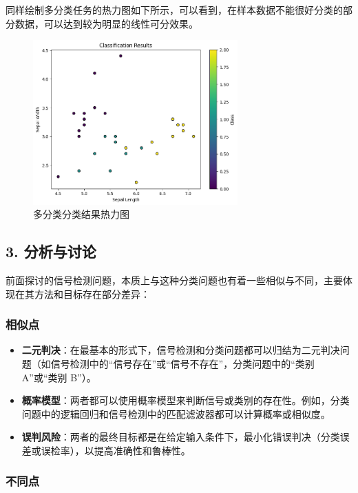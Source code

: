 \documentclass[12pt]{ctexart}
\begin{document}
同样绘制多分类任务的热力图如下所示，可以看到，在样本数据不能很好分类的部分数据，可以达到较为明显的线性可分效果。

\begin{figure}[H]
    \centering
    \includegraphics[width=0.7\textwidth]{image/output8.png}
    \caption{多分类分类结果热力图}
\end{figure}

\subsection*{3. 分析与讨论}

前面探讨的信号检测问题，本质上与这种分类问题也有着一些相似与不同，主要体现在其方法和目标存在部分差异：

\subsubsection*{相似点}

\begin{itemize}
    \item \textbf{二元判决}：在最基本的形式下，信号检测和分类问题都可以归结为二元判决问题（如信号检测中的“信号存在”或“信号不存在”，分类问题中的“类别 A”或“类别 B”）。
    \item \textbf{概率模型}：两者都可以使用概率模型来判断信号或类别的存在性。例如，分类问题中的逻辑回归和信号检测中的匹配滤波器都可以计算概率或相似度。
    \item \textbf{误判风险}：两者的最终目标都是在给定输入条件下，最小化错误判决（分类误差或误检率），以提高准确性和鲁棒性。
\end{itemize}

\subsubsection*{不同点}
\end{document}
